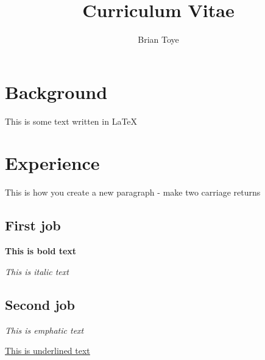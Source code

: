 \documentclass{article}
\author{Brian Toye}
\title{Curriculum Vitae}
\begin{document}
\maketitle

\section{Background}

This is some text written in {\LaTeX}

\section{Experience}

This is how you create a new paragraph - make two carriage returns

\subsection{First job}

\textbf {This is bold text}

\textit {This is italic text}
\subsection{Second job}

\emph{This is emphatic text}

\underline{This is underlined text}
\end{document}
